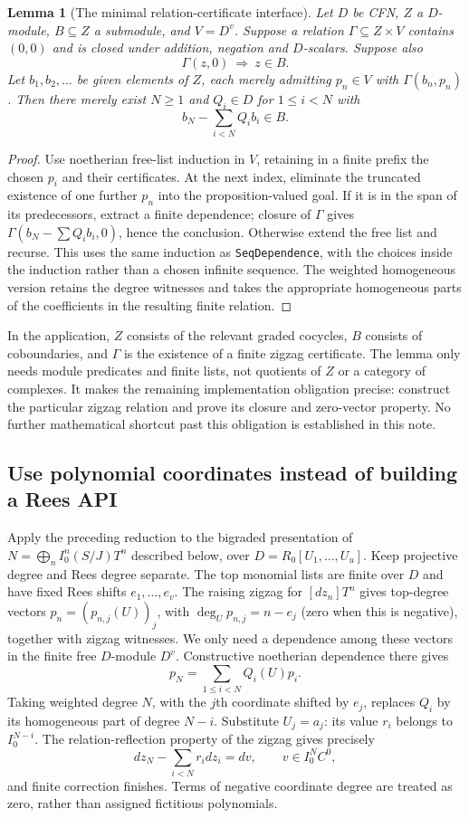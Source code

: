\documentclass[11pt]{amsart}
\newtheorem{lemma}[theorem]{Lemma}
\theoremstyle{definition}
\theoremstyle{remark}
\newcommand{\code}[1]{\texttt{#1}}
\begin{document}
\begin{lemma}[The minimal relation-certificate interface]\label{lem:interface}
Let $D$ be CFN, $Z$ a $D$-module, $B\subseteq Z$ a submodule, and
$V=D^v$. Suppose a relation $\Gamma\subseteq Z\times V$ contains
$(0,0)$ and is closed under addition, negation and $D$-scalars.
Suppose also
\[
 \Gamma(z,0)\ \Longrightarrow\ z\in B.
\]
Let $b_1,b_2,\ldots$ be given elements of $Z$, each merely admitting
$p_n\in V$ with $\Gamma(b_n,p_n)$. Then there merely exist $N\geq1$
and $Q_i\in D$ for $1\leq i<N$ with
\[
 b_N-\sum_{i<N}Q_i b_i\in B.
\]
\end{lemma}
\begin{proof}
Use noetherian free-list induction in $V$, retaining in a finite
prefix the chosen $p_i$ and their certificates. At the next index,
eliminate the truncated existence of one further $p_n$ into the
proposition-valued goal. If it is in the span of its predecessors,
extract a finite dependence; closure of $\Gamma$ gives
$\Gamma(b_N-\sum Q_i b_i,0)$, hence the conclusion. Otherwise extend
the free list and recurse. This uses the same induction as
\code{SeqDependence}, with the choices inside the induction rather
than a chosen infinite sequence. The weighted homogeneous version
retains the degree witnesses and takes the appropriate homogeneous
parts of the coefficients in the resulting finite relation.
\end{proof}

In the application, $Z$ consists of the relevant graded cocycles,
$B$ consists of coboundaries, and $\Gamma$ is the existence of a
finite zigzag certificate. The lemma only needs module predicates
and finite lists, not quotients of $Z$ or a category of complexes.
It makes the remaining implementation obligation precise: construct
the particular zigzag relation and prove its closure and zero-vector
property. No further mathematical shortcut past this obligation is
established in this note.

\subsection{Use polynomial coordinates instead of building a Rees API}
Apply the preceding reduction to the bigraded presentation of
$N=\bigoplus_n I_0^n(S/J)T^n$ described below, over
$D=R_0[U_1,\ldots,U_u]$. Keep projective degree and Rees degree
separate. The top monomial lists are finite over $D$ and have fixed
Rees shifts $e_1,\ldots,e_v$. The raising zigzag for $[dz_n]T^n$
gives top-degree vectors $p_n=(p_{n,j}(U))_j$, with
$\deg_U p_{n,j}=n-e_j$ (zero when this is negative), together with
zigzag witnesses. We only need a dependence
among these vectors in the finite free $D$-module $D^v$.
Constructive noetherian dependence there gives
\[
 p_N=\sum_{1\leq i<N}Q_i(U)p_i.
\]
Taking weighted degree $N$, with the $j$th coordinate shifted by
$e_j$, replaces $Q_i$ by its homogeneous part of degree $N-i$.
Substitute $U_j=a_j$: its value $r_i$ belongs to $I_0^{N-i}$.
The relation-reflection property of the zigzag gives precisely
\[
 dz_N-\sum_{i<N}r_i dz_i=dv,\qquad v\in I_0^NC^0,
\]
and finite correction finishes. Terms of negative coordinate degree
are treated as zero, rather than assigned fictitious polynomials.
\end{document}
